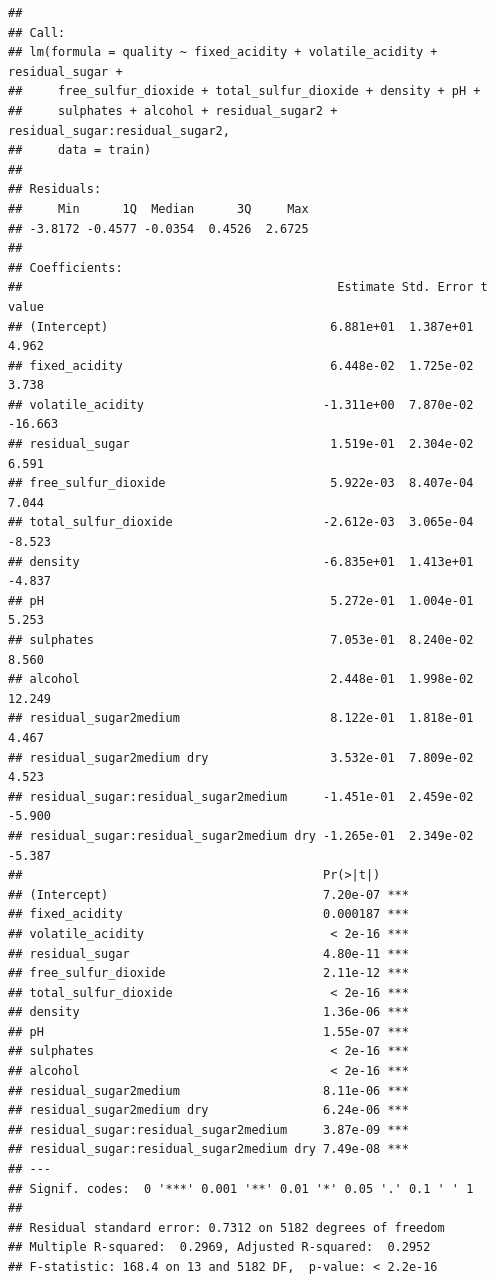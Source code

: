 \documentclass[12pt,]{article}
\begin{document}
\begin{verbatim}
## 
## Call:
## lm(formula = quality ~ fixed_acidity + volatile_acidity + residual_sugar + 
##     free_sulfur_dioxide + total_sulfur_dioxide + density + pH + 
##     sulphates + alcohol + residual_sugar2 + residual_sugar:residual_sugar2, 
##     data = train)
## 
## Residuals:
##     Min      1Q  Median      3Q     Max 
## -3.8172 -0.4577 -0.0354  0.4526  2.6725 
## 
## Coefficients:
##                                            Estimate Std. Error t value
## (Intercept)                               6.881e+01  1.387e+01   4.962
## fixed_acidity                             6.448e-02  1.725e-02   3.738
## volatile_acidity                         -1.311e+00  7.870e-02 -16.663
## residual_sugar                            1.519e-01  2.304e-02   6.591
## free_sulfur_dioxide                       5.922e-03  8.407e-04   7.044
## total_sulfur_dioxide                     -2.612e-03  3.065e-04  -8.523
## density                                  -6.835e+01  1.413e+01  -4.837
## pH                                        5.272e-01  1.004e-01   5.253
## sulphates                                 7.053e-01  8.240e-02   8.560
## alcohol                                   2.448e-01  1.998e-02  12.249
## residual_sugar2medium                     8.122e-01  1.818e-01   4.467
## residual_sugar2medium dry                 3.532e-01  7.809e-02   4.523
## residual_sugar:residual_sugar2medium     -1.451e-01  2.459e-02  -5.900
## residual_sugar:residual_sugar2medium dry -1.265e-01  2.349e-02  -5.387
##                                          Pr(>|t|)    
## (Intercept)                              7.20e-07 ***
## fixed_acidity                            0.000187 ***
## volatile_acidity                          < 2e-16 ***
## residual_sugar                           4.80e-11 ***
## free_sulfur_dioxide                      2.11e-12 ***
## total_sulfur_dioxide                      < 2e-16 ***
## density                                  1.36e-06 ***
## pH                                       1.55e-07 ***
## sulphates                                 < 2e-16 ***
## alcohol                                   < 2e-16 ***
## residual_sugar2medium                    8.11e-06 ***
## residual_sugar2medium dry                6.24e-06 ***
## residual_sugar:residual_sugar2medium     3.87e-09 ***
## residual_sugar:residual_sugar2medium dry 7.49e-08 ***
## ---
## Signif. codes:  0 '***' 0.001 '**' 0.01 '*' 0.05 '.' 0.1 ' ' 1
## 
## Residual standard error: 0.7312 on 5182 degrees of freedom
## Multiple R-squared:  0.2969, Adjusted R-squared:  0.2952 
## F-statistic: 168.4 on 13 and 5182 DF,  p-value: < 2.2e-16
\end{verbatim}
\end{document}
